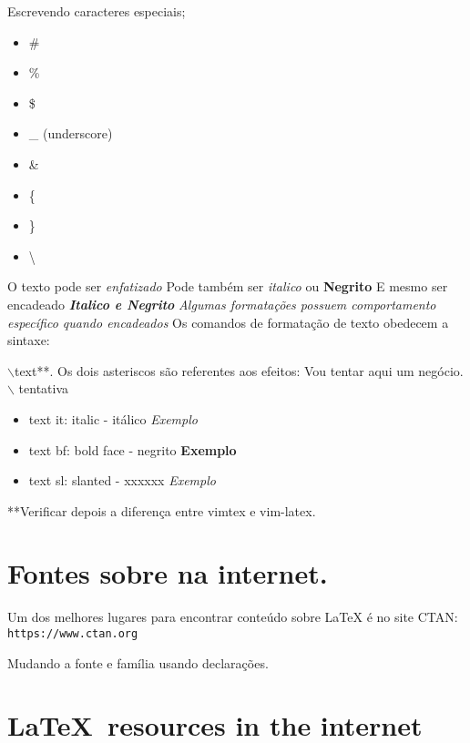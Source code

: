 \documentclass[a4paper, 12pt]{article}
\begin{document}
Escrevendo caracteres especiais;
\begin{itemize}
        \item \#
        \item \%
        \item \$
        \item \_ (underscore)
        \item \&
        \item \{
        \item \}
        \item \textbackslash

\end{itemize}

O texto pode ser \emph{enfatizado}
Pode também ser \textit{italico} ou \textbf{Negrito}
E mesmo ser encadeado \textbf{\textit{Italico e Negrito}}
\emph{Algumas formatações possuem \emph{comportamento específico} quando encadeados}
Os comandos de formatação de texto obedecem a sintaxe: 

$\backslash$text**. Os dois asteriscos são referentes aos efeitos:
Vou tentar aqui um negócio. $\backslash$ tentativa

\begin{itemize}
    \item{text it: italic - itálico}
        \textit{Exemplo}
    \item{text bf: bold face - negrito}
        \textbf{Exemplo}
    \item{text sl: slanted - xxxxxx}
        \textsl{Exemplo}
\end{itemize}

**Verificar depois a diferença entre vimtex e vim-latex.

\section{\textsf{Fontes sobre \latex na internet.}}

Um dos melhores lugares para encontrar conteúdo sobre LaTeX é no site CTAN:
\texttt{https://www.ctan.org}



Mudando a fonte e família usando declarações.

\section{\sffamily\LaTeX\ resources in the internet}
\end{document}
